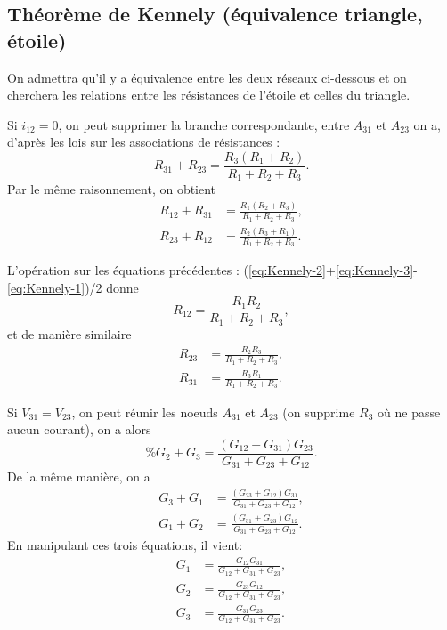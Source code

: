 \subsection{Théorème de Kennely (équivalence triangle, étoile)}%

On admettra qu'il y a équivalence entre les deux réseaux ci-dessous et on 
cherchera les relations entre les résistances de l'étoile et celles du 
triangle.

Si \(i_{12} = 0\), on peut supprimer la branche correspondante, entre 
\(A_{31}\) et \(A_{23}\) on a, d'après les lois sur les associations de 
résistances :
\begin{equation}%
\label{eq:Kennely-1}%
R_{31} + R_{23} = \frac{R_3(R_1+R_2)}{R_1+R_2+R_3}.
\end{equation}%
Par le même raisonnement, on obtient
\begin{align}%
\label{eq:Kennely-2} R_{12} + R_{31} & = \frac{R_1(R_2+R_3)}{R_1+R_2+R_3}, \\%
\label{eq:Kennely-3} R_{23} + R_{12} &= \frac{R_2(R_3+R_1)}{R_1+R_2+R_3}.%
\end{align}%

L'opération sur les équations précédentes : 
(\ref{eq:Kennely-2}+\ref{eq:Kennely-3}-\ref{eq:Kennely-1})/2 donne
\begin{equation}\label{eq:Kennely-12}%
R_{12} = \frac{R_1 R_2}{R_1+R_2+R_3},
\end{equation}%
et de manière similaire
\begin{align}%
\label{eq:Kennely-23} R_{23} &= \frac{R_2 R_3}{R_1+R_2+R_3}, \\%
\label{eq:Kennely-31} R_{31} &= \frac{R_3 R_1}{R_1+R_2+R_3}.%
\end{align}%

Si \(V_{31} = V_{23}\), on peut réunir les noeuds \(A_{31}\) et \(A_{23}\) (on 
supprime \(R_3\) où ne passe aucun courant), on a alors
\begin{equation}\%
G_2 + G_3 = \frac{(G_{12} + G_{31})G_{23}}{G_{31}+G_{23}+G_{12}}.
\end{equation}%
De la même manière, on a
\begin{align}%
G_3+G_1 &= \frac{(G_{23} + G_{12})G_{31}}{G_{31}+G_{23}+G_{12}}, \\
G_1+G_2 &= \frac{(G_{31} + G_{23})G_{12}}{G_{31}+G_{23}+G_{12}}.
\end{align}%
En manipulant ces trois équations, il vient:
\begin{align}%
G_1 &= \frac{G_{12} G_{31}}{G_{12}+G_{31}+G_{23}}, \\
G_2 &= \frac{G_{23} G_{12}}{G_{12}+G_{31}+G_{23}}, \\
G_3 &= \frac{G_{31} G_{23}}{G_{12}+G_{31}+G_{23}}.
\end{align}%

